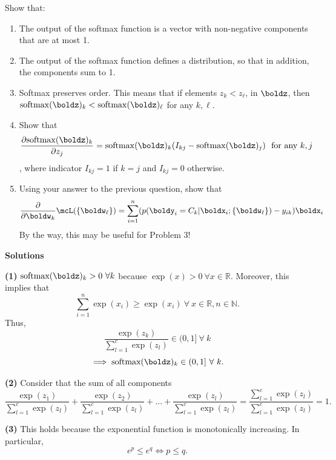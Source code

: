 \documentclass[submit]{harvardml}
\begin{document}
\begin{problem}
Show that:
\begin{enumerate}
  \item The output of the softmax function is a vector with non-negative components
    that are at most 1. 
%
  \item The output of the softmax function defines a distribution,
so that in addition, the components sum to 1.
%
  \item Softmax preserves order. This means that if elements $z_k < z_\ell$,
in $\boldz$, then  $\mathrm{softmax}(\boldz)_k < \mathrm{softmax}(\boldz)_{\ell}$ for any $k,\ell$. 
  \item Show that \[\frac{\partial \mathrm{softmax}(\boldz)_k }{\partial z_j} = \mathrm{softmax}(\boldz)_k (I_{kj} - \mathrm{softmax}(\boldz)_j) \ \ \text{for\ any\ } k, j  \],
%
where indicator $I_{kj}=1$ if $k=j$ and $I_{kj}=0$ otherwise.
%
  \item Using your answer to the previous question, show that
    \[ \frac{\partial }{\partial \boldw_k} \mcL(\{\boldw_{\ell}\}) = \sum_{i=1}^n (p(\boldy_i = C_k | \boldx_i; \{\boldw_\ell\}) - y_{ik} ) \boldx_i  \]
    By the way, this may be useful for Problem 3!
\end{enumerate}
\end{problem}

\newpage

\noindent\textbf{Solutions}

\noindent\textbf{(1)}  $\text{softmax}(\boldz)_k > 0 \ \forall k$ because $\exp(x) > 0 \ \forall x \in \mathbb{R}$. Moreover, this implies that $$\sum_{i=1}^n \exp(x_i) \geq \exp(x_i) \ \forall \ x \in \mathbb{R}, n \in \mathbb{N}.$$ Thus, 
$$\frac{\exp(z_k)}{\sum_{l=1}^c \exp(z_l)} \in (0,1] \ \forall \ k$$
$$\implies \text{softmax}(\boldz)_k \in (0,1] \ \forall \ k.$$

\bigskip

\noindent\textbf{(2)} Consider that the sum of all components
$$ \frac{\exp(z_1)}{\sum_{l=1}^c \exp(z_l)} + \frac{\exp(z_2)}{\sum_{l=1}^c \exp(z_l)} + ... + \frac{\exp(z_l)}{\sum_{l=1}^c \exp(z_l)} = \frac{\sum_{l=1}^c \exp(z_l)}{\sum_{l=1}^c \exp(z_l)} = 1.$$

\bigskip

\noindent\textbf{(3)} This holds because the exponential function is monotonically increasing. In particular, $$e^{p} \leq e^{q} \iff p \leq q.$$

\bigskip
\end{document}
